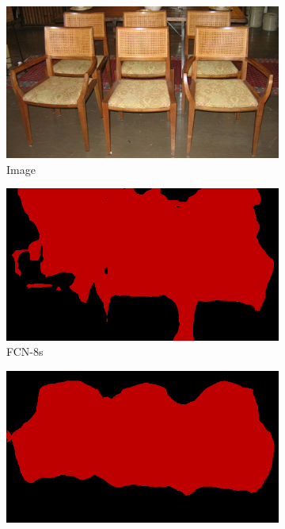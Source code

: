 \documentclass{article} %
\begin{document}
\begin{figure}[t]
  \begin{subfigure}[b]{0.19\linewidth}
    \includegraphics[width=\textwidth]{figs/ab/img/2008_001439}
        \caption{Image}
  \end{subfigure}
  \begin{subfigure}[b]{0.19\linewidth}
    \includegraphics[width=\textwidth]{figs/ab/fcn/2008_001439}
        \caption{FCN-8s}
  \end{subfigure}
  \begin{subfigure}[b]{0.19\linewidth}
    \includegraphics[width=\textwidth]{figs/ab/deeplab/2008_001439}

\end{subfigure}
\end{figure}
\end{document}
